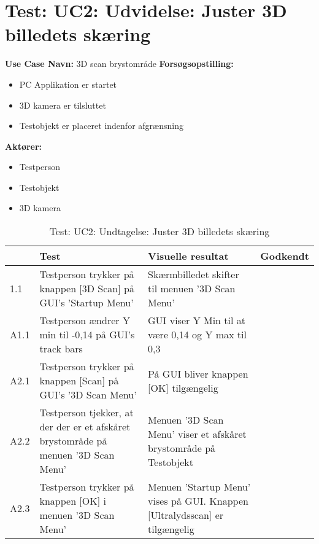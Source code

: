 \section{Test: UC2: Udvidelse: Juster 3D billedets skæring}
\textbf{Use Case Navn:} 3D scan brystområde \newline
\textbf{Forsøgsopstilling:}
\begin{itemize}
\item PC Applikation er startet
\item 3D kamera er tilsluttet
\item Testobjekt er placeret indenfor afgrænsning 
\end{itemize}  
\textbf{Aktører:}
\begin{itemize}
\item Testperson
\item Testobjekt
\item 3D kamera
\end{itemize}  

\begin{table}[htb]
\begin{tabularx}{\textwidth}{|p{0.7cm}|X|X|p{2cm}|}
\hline
\textbf{} & \textbf{Test} & \textbf{Visuelle resultat} &\textbf{Godkendt} \\\hline
1.1 & Testperson trykker på knappen [3D Scan] på GUI's 'Startup Menu' & Skærmbilledet skifter til menuen '3D Scan Menu' &  \\\hline
A1.1 & Testperson ændrer Y min til -0,14 på GUI's track bars & GUI viser Y Min til at være 0,14 og Y max til 0,3  & \\\hline
A2.1 & Testperson trykker på knappen [Scan] på GUI's '3D Scan Menu' & På GUI bliver knappen [OK] tilgængelig &  \\\hline
A2.2 & Testperson tjekker, at der der er et afskåret brystområde på menuen '3D Scan Menu' & Menuen '3D Scan Menu' viser et afskåret brystområde på Testobjekt & \\\hline
A2.3 & Testperson trykker på knappen [OK] i menuen '3D Scan Menu' & Menuen 'Startup Menu' vises på GUI. Knappen [Ultralydsscan] er tilgængelig & \\\hline
\end{tabularx}
    \caption{Test: UC2: Undtagelse: Juster 3D billedets skæring}
    \label{uc2_test_e_1_label}  
\end{table}
\newpage


